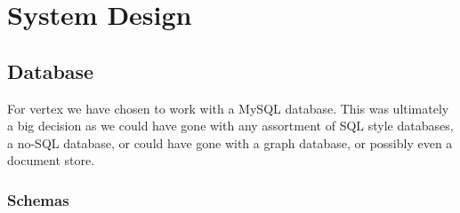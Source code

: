 \chapter{System Design}
\section{Database}
For vertex we have chosen to work with a MySQL database. This was ultimately a big decision as we could have gone with any assortment of SQL style databases, a no-SQL database, or could have gone with a graph database, or possibly even a document store.

\subsection{Schemas}
